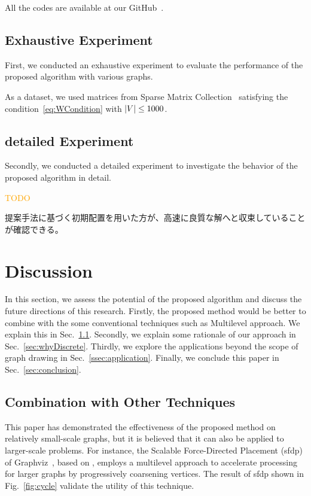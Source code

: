\documentclass[dvipdfmx,journal]{IEEEtran}
\newcommand{\orange}[1]{\textcolor{orange}{#1}}
\begin{document}
All the codes are available at our GitHub~\cite{ThisPaperGitHub}.

\subsection{Exhaustive Experiment}\label{ssec:exprAll}

First, we conducted an exhaustive experiment to evaluate the performance of the proposed algorithm with various graphs.

As a dataset, we used matrices from Sparse Matrix Collection~\cite{davis2011university} satisfying the condition~\eqref{eq:WCondition} with $\abs{V} \leq 1000$.

\subsection{detailed Experiment}\label{ssec:exprDetail}

Secondly, we conducted a detailed experiment to investigate the behavior of the proposed algorithm in detail.

\orange{TODO}

提案手法に基づく初期配置を用いた方が、高速に良質な解へと収束していることが確認できる。

\section{Discussion} \label{sec:discussion}

In this section, we assess the potential of the proposed algorithm and discuss the future directions of this research.
Firstly, the proposed method would be better to combine with the some conventional techniques such as Multilevel approach. We explain this in Sec.~\ref{sec:combination}.
Secondly, we explain some rationale of our approach in Sec.~\ref{sec:whyDiscrete}.
Thirdly, we explore the applications beyond the scope of graph drawing in Sec.~\ref{ssec:application}.
Finally, we conclude this paper in Sec.~\ref{sec:conclusion}.

\subsection{Combination with Other Techniques}\label{sec:combination}

This paper has demonstrated the effectiveness of the proposed method on relatively small-scale graphs, but it is believed that it can also be applied to larger-scale problems.
For instance, the Scalable Force-Directed Placement (sfdp) of Graphviz~\cite{ellsonGraphvizOpenSource2002}, based on \cite{Hu2006EfficientHF}, employs a multilevel approach to accelerate processing for larger graphs by progressively coarsening vertices.
The result of sfdp shown in Fig.~\ref{fig:cycle} validate the utility of this technique.
\end{document}
